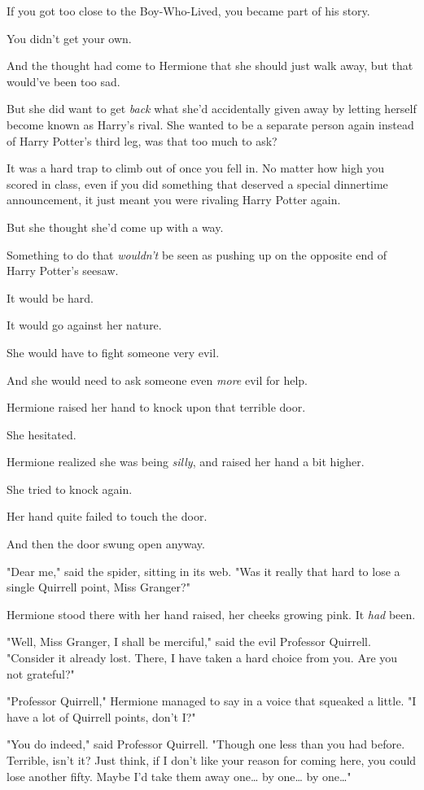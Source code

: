 If you got too close to the Boy-Who-Lived, you became part of his story.

You didn't get your own.

And the thought had come to Hermione that she should just walk away, but that 
would've been too sad.

But she did want to get \emph{back} what she'd accidentally given away by 
letting herself become known as Harry's rival. She wanted to be a separate 
person again instead of Harry Potter's third leg, was that too much to ask?

It was a hard trap to climb out of once you fell in. No matter how high you 
scored in class, even if you did something that deserved a special dinnertime 
announcement, it just meant you were rivaling Harry Potter again.

But she thought she'd come up with a way.

Something to do that \emph{wouldn't} be seen as pushing up on the opposite end 
of Harry Potter's seesaw.

It would be hard.

It would go against her nature.

She would have to fight someone very evil.

And she would need to ask someone even \emph{more} evil for help.

Hermione raised her hand to knock upon that terrible door.

She hesitated.

Hermione realized she was being \emph{silly}, and raised her hand a bit higher.

She tried to knock again.

Her hand quite failed to touch the door.

And then the door swung open anyway.

"Dear me," said the spider, sitting in its web. "Was it really that hard to 
lose a single Quirrell point, Miss Granger?"

Hermione stood there with her hand raised, her cheeks growing pink. It 
\emph{had} been.

"Well, Miss Granger, I shall be merciful," said the evil Professor Quirrell. 
"Consider it already lost. There, I have taken a hard choice from you. Are you 
not grateful?"

"Professor Quirrell," Hermione managed to say in a voice that squeaked a 
little. "I have a lot of Quirrell points, don't I?"

"You do indeed," said Professor Quirrell. "Though one less than you had before. 
Terrible, isn't it? Just think, if I don't like your reason for coming here, 
you could lose another fifty. Maybe I'd take them away one{\ldots} by 
one{\ldots} by one{\ldots}"

